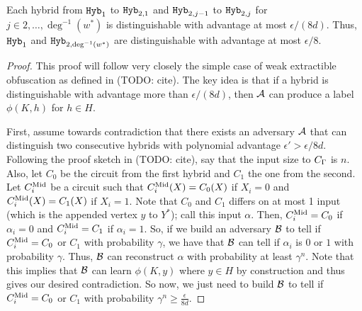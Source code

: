 \begin{lemma}
	\label{lemma:hybB}
	Each hybrid from $\texttt{Hyb}_1$ to $\texttt{Hyb}_{2, 1}$ and $\texttt{Hyb}_{2, j - 1}$ to $\texttt{Hyb}_{2, j}$ for $j \in 2, \dots, \deg^{-1}(w^*)$
	is distinguishable with advantage at most $\epsilon / (8d)$. Thus, $\texttt{Hyb}_1$ and $\texttt{Hyb}_{2, \deg^{-1}(w^*)}$ are distinguishable with advantage at most $\epsilon / 8$.
	\begin{proof}
		This proof will follow very closely the simple case of weak extractible obfuscation	as defined in (TODO: cite).
		The key idea is that if a hybrid is distinguishable with advantage more than $\epsilon / (8d)$, then
		$\mathcal{A}$ can produce a label $\phi(K, h)$ for $h \in H$.

		First, assume towards contradiction that there exists an adversary $\mathcal{A}$ that can distinguish two consecutive hybrids
		with polynomial advantage $\epsilon' > \epsilon / 8d$.
		Following the proof sketch in (TODO: cite), say that the input size to $C_\Gamma$ is $n$.
		Also, let $C_0$ be the circuit from the first hybrid and $C_1$ the one from the second.
		Let $C^{\text{Mid}}_i$ be a circuit such that $C^{\text{Mid}}_i(X) = C_0(X)$ if $X_i = 0$ and $C^{\text{Mid}}_i(X) = C_1(X)$ if $X_i = 1$.
		Note that $C_0$ and $C_1$ differs on at most 1 input (which is the appended vertex $y$ to $Y^*$);
		call this input $\alpha$.
		Then, $C^{\text{Mid}}_i = C_0$ if $\alpha_i = 0$ and $C^{\text{Mid}}_i = C_1$ if $\alpha_i = 1$.
		So, if we build an adversary $\mathcal{B}$ to tell if $C^{\text{Mid}}_i = C_0$ or $C_1$ with probability $\gamma$,
		we have that $\mathcal{B}$ can tell if $\alpha_i$ is $0$ or $1$ with probability $\gamma$.
		Thus, $\mathcal{B}$ can reconstruct $\alpha$ with probability at least $\gamma^n$.
		Note that this implies that $\mathcal{B}$ can learn $\phi(K, y)$ where $y \in H$ by construction
		and thus gives our desired contradiction.
		So now, we just need to build $\mathcal{B}$ to tell if $C^{\text{Mid}}_i = C_0$ or $C_1$ with probability $\gamma^n \geq \frac{\epsilon}{8d}$.


\end{proof}
\end{lemma}
